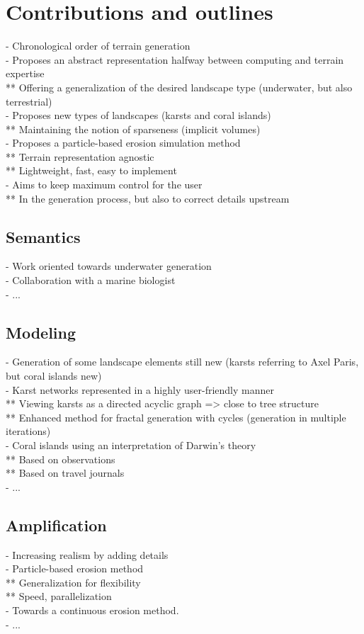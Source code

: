 \section{Contributions and outlines}
\label{sec:introduction_contribution-plan}
- Chronological order of terrain generation \\
- Proposes an abstract representation halfway between computing and terrain expertise \\
** Offering a generalization of the desired landscape type (underwater, but also terrestrial) \\
- Proposes new types of landscapes (karsts and coral islands) \\
** Maintaining the notion of sparseness (implicit volumes) \\
- Proposes a particle-based erosion simulation method \\
** Terrain representation agnostic \\
** Lightweight, fast, easy to implement \\
- Aims to keep maximum control for the user \\ 
** In the generation process, but also to correct details upstream

\subsection{Semantics}
- Work oriented towards underwater generation \\
- Collaboration with a marine biologist \\
- ...

\subsection{Modeling}
- Generation of some landscape elements still new (karsts referring to Axel Paris, but coral islands new) \\
- Karst networks represented in a highly user-friendly manner \\
** Viewing karsts as a directed acyclic graph => close to tree structure \\
** Enhanced method for fractal generation with cycles (generation in multiple iterations) \\
- Coral islands using an interpretation of Darwin's theory \\
** Based on observations \\
** Based on travel journals \\
- ... 

\subsection{Amplification}
- Increasing realism by adding details \\
- Particle-based erosion method \\
** Generalization for flexibility \\
** Speed, parallelization \\
- Towards a continuous erosion method. \\
- ... 
